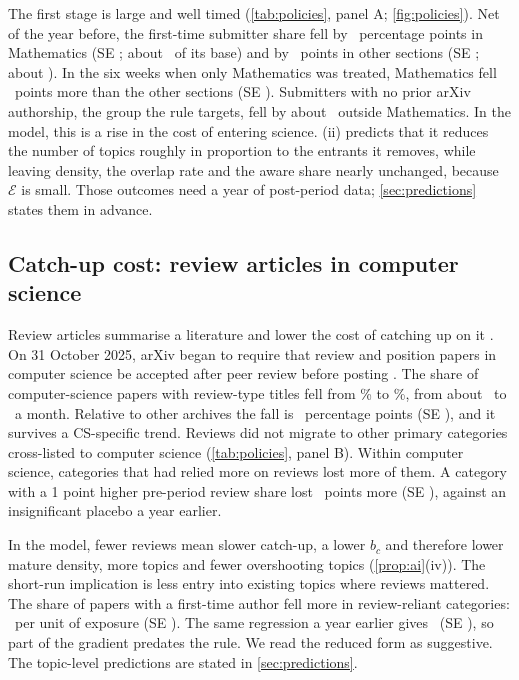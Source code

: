 The first stage is large and well timed (\cref{tab:policies}, panel A;
\cref{fig:policies}). Net of the year before, the first-time submitter share fell by
\empEndMath\ percentage points in Mathematics (SE \empEndMathSE; about
\empEndMathRel\ of its base) and by \empEndOther\ points in other sections (SE
\empEndOtherSE; about \empEndOtherRel). In the six weeks when only Mathematics was
treated, Mathematics fell \empEndStag\ points more than the other sections (SE
\empEndStagSE). Submitters with no prior arXiv authorship, the group the rule
targets, fell by about \empEndNoTrackOtherRel\ outside Mathematics. In the model,
this is a rise in the cost of entering science. (ii) predicts that
it reduces the number of topics roughly in proportion to the entrants it
removes, while leaving density, the overlap rate and the aware share nearly
unchanged, because $\mathcal E$ is small. Those outcomes need a year of
post-period data; \cref{sec:predictions} states them in advance.

\subsection{Catch-up cost: review articles in computer science}

Review articles summarise a literature and lower the cost of catching up on it
\citep{mcmahanmcfarland2021}. On 31 October 2025, arXiv began to require that
review and position papers in computer science be accepted after peer review
before posting \citep{arxivcsreview2025}. The share of computer-science papers
with review-type titles fell from \empCSpre\% to \empCSpost\%, from about
\empCSperMonthPre\ to \empCSperMonthPost\ a month. Relative to other archives the
fall is \empCSdid\ percentage points (SE \empCSdidSE), and it survives a CS-specific trend.
Reviews did not migrate to other primary categories cross-listed to computer
science (\cref{tab:policies}, panel B). Within computer science, categories that
had relied more on reviews lost more of them. A category with a 1 point higher
pre-period review share lost \empCSdoseFS\ points more (SE \empCSdoseFSSE),
against an insignificant placebo a year earlier.

In the model, fewer reviews mean slower catch-up, a lower $b_c$ and
therefore lower mature density, more topics and fewer overshooting topics
(\cref{prop:ai}(iv)). The short-run implication is less entry into existing
topics where reviews mattered. The share of papers with a first-time author fell
more in review-reliant categories: \empCSdoseRF\ per unit of exposure (SE
\empCSdoseRFSE). The same regression a year earlier gives \empCSdoseRFpl\ (SE
\empCSdoseRFplSE), so part of the gradient predates the rule. We read the reduced
form as suggestive. The topic-level predictions are stated in
\cref{sec:predictions}.

